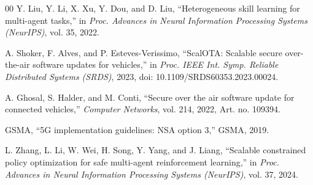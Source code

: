 \documentclass[conference]{IEEEtran}
\begin{document}
\begin{thebibliography}{00}
Y. Liu, Y. Li, X. Xu, Y. Dou, and D. Liu,
``Heterogeneous skill learning for multi-agent tasks,'' in \textit{Proc. Advances
in Neural Information Processing Systems (NeurIPS)}, vol. 35, 2022.

A. Shoker, F. Alves, and P. Esteves-Verissimo,
``ScalOTA: Scalable secure over-the-air software updates for vehicles,''
in \textit{Proc. IEEE Int. Symp. Reliable Distributed Systems (SRDS)}, 2023,
doi: 10.1109/SRDS60353.2023.00024.

A. Ghosal, S. Halder, and M. Conti,
``Secure over the air software update for connected vehicles,''
\textit{Computer Networks}, vol. 214, 2022, Art. no. 109394.

GSMA,
``5G implementation guidelines: NSA option 3,'' GSMA, 2019.

L. Zhang, L. Li, W. Wei, H. Song, Y. Yang, and J. Liang,
``Scalable constrained policy optimization for safe multi-agent reinforcement learning,''
in \textit{Proc. Advances in Neural Information Processing Systems (NeurIPS)}, vol. 37, 2024.
\end{thebibliography}
\end{document}
